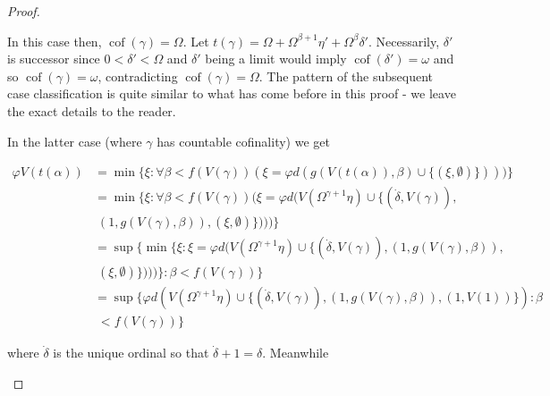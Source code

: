\documentclass{article}
\theoremstyle{definition}
\theoremstyle{plain}
\theoremstyle{plain}
\theoremstyle{plain}
\theoremstyle{plain}
\theoremstyle{remark}
\theoremstyle{remark}
\theoremstyle{remark}
\theoremstyle{plain}
\theoremstyle{plain}
\begin{document}
\begin{proof}
\begin{enumerate}
\begin{enumerate}
\begin{enumerate}
\begin{enumerate}
                In this case then, $\operatorname{cof}(\gamma) = \Omega$. Let $t(\gamma) = \Omega + \Omega^{\beta+1} \eta' + \Omega^\beta \delta'$. Necessarily, $\delta'$ is successor since $0 < \delta' < \Omega$ and $\delta'$ being a limit would imply $\operatorname{cof}(\delta') = \omega$ and so $\operatorname{cof}(\gamma) = \omega$, contradicting $\operatorname{cof}(\gamma) = \Omega$. The pattern of the subsequent case classification is quite similar to what has come before in this proof - we leave the exact details to the reader.
                
                In the latter case (where $\gamma$ has countable cofinality) we get

                \begin{equation}
                \begin{split}
                \varphi V(t(\alpha)) & = \min\{\xi: \forall \beta < f(V(\gamma)) (\xi = \varphi d(g(V(t(\alpha)),\beta) \cup \{(\xi, \emptyset)\})))\} \\ & = \min\{\xi: \forall \beta < f(V(\gamma)) (\xi = \varphi d(V(\Omega^{\gamma+1} \eta) \cup \{(\dot{\delta}, V(\gamma)), \\ & \; (1,g(V(\gamma),\beta)), (\xi, \emptyset)\})))\} \\ & = \sup\{\min\{\xi: \xi = \varphi d(V(\Omega^{\gamma+1} \eta) \cup \{(\dot{\delta}, V(\gamma)), (1,g(V(\gamma),\beta)), \\ & \; (\xi, \emptyset)\})))\}: \beta < f(V(\gamma))\} \\ & = \sup\{\varphi d(V(\Omega^{\gamma+1} \eta) \cup \{(\dot{\delta}, V(\gamma)), (1,g(V(\gamma),\beta)), (1,V(1))\}): \beta \\ & \; < f(V(\gamma))\}
                \end{split}
                \end{equation}

                where $\dot{\delta}$ is the unique ordinal so that $\dot{\delta}+1 = \delta$. Meanwhile


\end{enumerate}
\end{enumerate}
\end{enumerate}
\end{enumerate}
\end{proof}
\end{document}
